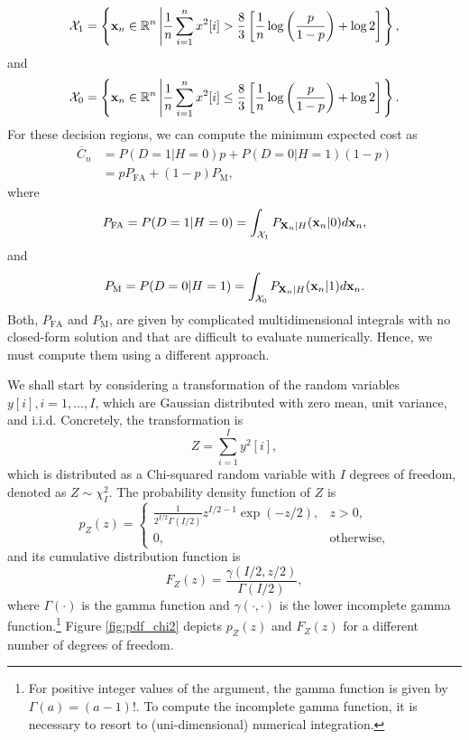 \begin{equation*}
	{\cal X}_1 = \left\{{\mathbf x}_n \in \mathbb{R}^{n} \left| \frac{1}{n} \sum_{i = 1}^{n} x^2[i]  >  \frac{8}{3} \left[ \frac{1}{n}  \log \left(\frac{p}{1 - p}  \right) + \log 2 \right] \right. \right\},
\end{equation*}
and
\begin{equation*}
	{\cal X}_0 = \left\{{\mathbf x}_n \in \mathbb{R}^{n} \left| \frac{1}{n} \sum_{i = 1}^{n} x^2[i]  \leq \frac{8}{3} \left[ \frac{1}{n}  \log \left(\frac{p}{1 - p}  \right) + \log 2 \right] \right. \right\}.
\end{equation*}
For these decision regions, we can compute the minimum expected cost as
\begin{align*}
	\overline{C}_n &= P(D = 1 | H = 0) p +  P(D = 0 |H = 1) (1 - p) \\
	&= p P_{\text{FA}} + (1 - p) P_{\text{M}},
\end{align*}
where
\begin{equation*}
	P_{\text{FA}} = P(D = 1 | H = 0) = \int_{{\cal X}_1} P_{{\bf X}_n|H}({\bf x}_n|0) d {\bf x}_n,
\end{equation*}
and
\begin{equation*}
	P_{\text{M}} = P(D = 0 | H = 1) = \int_{{\cal X}_0} P_{{\bf X}_n|H}({\bf x}_n|1) d {\bf x}_n.
\end{equation*}
Both, $P_{\text{FA}}$ and $P_{\text{M}}$, are given by complicated multidimensional integrals with no closed-form solution and that are difficult to evaluate numerically. Hence, we must compute them using a different approach.

We shall start by considering a transformation of the random variables $y[i], i = 1, \ldots, I$, which are Gaussian distributed with zero mean, unit variance, and i.i.d. Concretely, the transformation is
\begin{equation*}
	Z = \sum_{i = 1}^{I} y^2[i],
\end{equation*}
which is distributed as a Chi-squared random variable with $I$ degrees of freedom, denoted as $Z \sim \chi^2_{I}$. The probability density function of $Z$ is
\begin{equation*}
	p_Z(z) = \begin{cases} \frac{1}{2^{I/2} \Gamma(I/2)} z^{I/2 - 1} \exp(-z/2), & z >0, \\ 0, & \text{otherwise,} \end{cases}
\end{equation*}
and its cumulative distribution function is
\begin{equation*}
	F_Z(z) = \frac{\gamma(I/2,z/2)}{\Gamma(I/2)},
\end{equation*}
where $\Gamma(\cdot)$ is the gamma function and $\gamma(\cdot,\cdot)$ is the lower incomplete gamma function.\footnote{For positive integer values of the argument, the gamma function is given by $\Gamma(a) = (a - 1)!$. To compute the incomplete gamma function, it is necessary to resort to (uni-dimensional) numerical integration.} Figure \ref{fig:pdf_chi2} depicts $p_Z(z)$ and $F_Z(z)$ for a different number of degrees of freedom.

